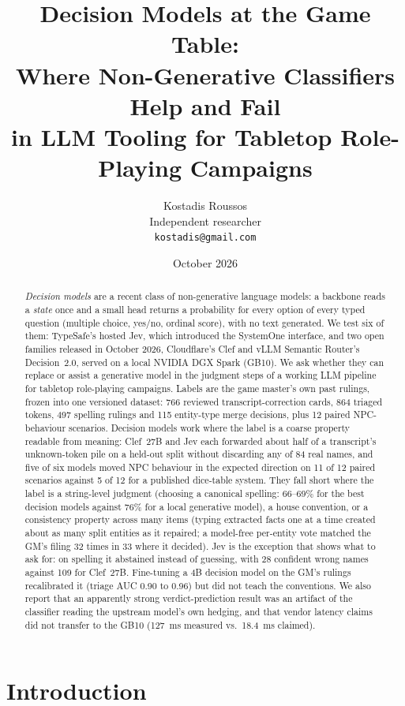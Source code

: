 \documentclass[11pt]{article}
\title{Decision Models at the Game Table:\\
Where Non-Generative Classifiers Help and Fail\\
in LLM Tooling for Tabletop Role-Playing Campaigns}
\author{Kostadis Roussos\\
Independent researcher\\
\texttt{kostadis@gmail.com}}
\date{October 2026}
\begin{document}
\maketitle

\begin{abstract}
\emph{Decision models} are a recent class of non-generative language models: a backbone reads a
\emph{state} once and a small head returns a probability for every option of every typed question
(multiple choice, yes/no, ordinal score), with no text generated. We test six of them: TypeSafe's
hosted Jev, which introduced the SystemOne interface, and two open families released in October 2026, Cloudflare's
Clef and vLLM Semantic Router's Decision~2.0, served on a local NVIDIA DGX Spark (GB10). We ask
whether they can replace or assist a generative model in the judgment steps of a working LLM
pipeline for tabletop role-playing campaigns. Labels are the game master's own past rulings,
frozen into one versioned dataset: 766 reviewed transcript-correction cards, 864 triaged tokens,
497 spelling rulings and 115 entity-type merge decisions, plus 12 paired NPC-behaviour scenarios.
Decision models work where the label is a coarse property readable from meaning: Clef~27B and Jev
each forwarded about half of a transcript's unknown-token pile on a held-out split without
discarding any of 84 real names, and five of six models moved NPC behaviour in the expected
direction on 11 of 12 paired scenarios against 5 of 12 for a published dice-table system. They
fall short where the label is a string-level judgment (choosing a canonical spelling: 66--69\% for
the best decision models against 76\% for a local generative model), a house convention, or a
consistency property across many items (typing extracted facts one at a time created about as many
split entities as it repaired; a model-free per-entity vote matched the GM's filing 32 times in 33
where it decided). Jev is the exception that shows what to ask for: on spelling it abstained
instead of guessing, with 28 confident wrong names against 109 for Clef~27B. Fine-tuning a 4B decision model
on the GM's rulings recalibrated it (triage AUC 0.90 to 0.96) but did not teach the conventions. We
also report that an apparently strong verdict-prediction result was an artifact of the classifier
reading the upstream model's own hedging, and that vendor latency claims did not transfer to the
GB10 (127~ms measured vs.\ 18.4~ms claimed).
\end{abstract}

\section{Introduction}
\end{document}
